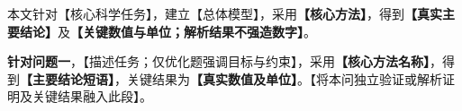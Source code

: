 本文针对【核心科学任务】，建立【总体模型】，采用\textbf{【核心方法】}，得到\textbf{【真实主要结论】}及\textbf{【关键数值与单位；解析结果不强造数字】}。

\textbf{针对问题一}，【描述任务；仅优化题强调目标与约束】，采用\textbf{【核心方法名称】}，得到\textbf{【主要结论短语】}，关键结果为\textbf{【真实数值及单位】}。【将本问独立验证或解析证明及关键结果融入此段】。

